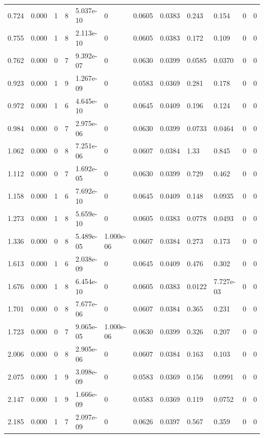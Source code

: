 \documentclass[preview]{standalone}
\begin{document}
{{\begin{tabular}{L{1.2cm}C{1.2cm} C{0.3cm}C{0.5cm} C{1.4cm}C{1.4cm} C{1.4cm}C{1.4cm} C{1.6cm}C{1.6cm} C{1.6cm}C{1.6cm}}
  0.724  &  0.000  & 1     &  8 &  5.037e-10  & 0  &  0.0605&   0.0383& 0.243 & 0.154   &  0 & 0  \\ 
  0.755  &  0.000  & 1     &  8 &  2.113e-10  & 0  &  0.0605&   0.0383& 0.172 & 0.109   &  0 & 0  \\ 
  0.762  &  0.000  & 0     &  7 &  9.392e-07  & 0  &  0.0630&   0.0399& 0.0585 & 0.0370   &  0 & 0  \\ 
  0.923  &  0.000  & 1     &  9 &  1.267e-09  & 0  &  0.0583&   0.0369& 0.281 & 0.178   &  0 & 0  \\ 
  0.972  &  0.000  & 1     &  6 &  4.645e-10  & 0  &  0.0645&   0.0409& 0.196 & 0.124   &  0 & 0  \\ 
  0.984  &  0.000  & 0     &  7 &  2.975e-06  & 0  &  0.0630&   0.0399& 0.0733 & 0.0464   &  0 & 0  \\ 
  1.062  &  0.000  & 0     &  8 &  7.251e-06  & 0  &  0.0607&   0.0384& 1.33 & 0.845   &  0 & 0  \\ 
  1.112  &  0.000  & 0     &  7 &  1.692e-05  & 0  &  0.0630&   0.0399& 0.729 & 0.462   &  0 & 0  \\ 
  1.158  &  0.000  & 1     &  6 &  7.692e-10  & 0  &  0.0645&   0.0409& 0.148 & 0.0935   &  0 & 0  \\ 
  1.273  &  0.000  & 1     &  8 &  5.659e-10  & 0  &  0.0605&   0.0383& 0.0778 & 0.0493   &  0 & 0  \\ 
  1.336  &  0.000  & 0     &  8 &  5.489e-05  & 1.000e-06  &  0.0607&   0.0384& 0.273 & 0.173   &  0 & 0  \\ 
  1.613  &  0.000  & 1     &  6 &  2.038e-09  & 0  &  0.0645&   0.0409& 0.476 & 0.302   &  0 & 0  \\ 
  1.676  &  0.000  & 1     &  8 &  6.454e-10  & 0  &  0.0605&   0.0383& 0.0122 & 7.727e-03   &  0 & 0  \\ 
  1.701  &  0.000  & 0     &  8 &  7.677e-06  & 0  &  0.0607&   0.0384& 0.365 & 0.231   &  0 & 0  \\ 
  1.723  &  0.000  & 0     &  7 &  9.065e-05  & 1.000e-06  &  0.0630&   0.0399& 0.326 & 0.207   &  0 & 0  \\ 
  2.006  &  0.000  & 0     &  8 &  2.905e-06  & 0  &  0.0607&   0.0384& 0.163 & 0.103   &  0 & 0  \\ 
  2.075  &  0.000  & 1     &  9 &  3.098e-09  & 0  &  0.0583&   0.0369& 0.156 & 0.0991   &  0 & 0  \\ 
  2.147  &  0.000  & 1     &  9 &  1.666e-09  & 0  &  0.0583&   0.0369& 0.119 & 0.0752   &  0 & 0  \\ 
  2.185  &  0.000  & 1     &  7 &  2.097e-09  & 0  &  0.0626&   0.0397& 0.567 & 0.359   &  0 & 0  \\ 

\end{tabular}}}
\end{document}
